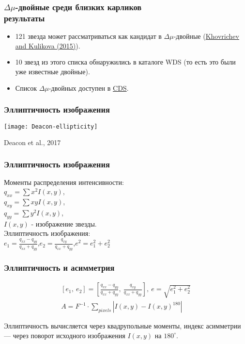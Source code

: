 \begin{frame}
\frametitle{$\Delta\mu$-двойные среди близких карликов\\{\small результаты}}
\begin{itemize}
\item 121 звезда может рассматриваться как кандидат в $\Delta\mu$-двойные (\href{https://ui.adsabs.harvard.edu/abs/2015AstL...41..833K/abstract}{Khovrichev and Kulikova (2015)}).
\item 10 звезд из этого списка обнаружились в каталоге WDS (то есть это были уже известные двойные).
\item Список $\Delta\mu$-двойных доступен в \href{http://vizier.u-strasbg.fr/viz-bin/VizieR-3?-source=J/PAZh/41/896/lpmsm15b}{CDS}.
\end{itemize}
\end{frame}






\begin{frame}
\frametitle{Эллиптичность изображения}
\begin{center}
	\texttt{[image: Deacon-ellipticity]}
\end{center}
{\footnotesize
	Deacon et al., 2017
}
\end{frame}


\begin{frame}
\frametitle{Эллиптичность изображения}
	Моменты распределения интенсивности:\\[5pt]
	$q_{xx}=\sum x^2 I(x,y)$,\\ $q_{xy}=\sum xy I(x,y)$,\\ $q_{yy}=\sum y^2 I(x,y)$,\\[10pt]
	$I(x,y)$ - изображение звезды.\\[15pt]
	Эллиптичность изображения:\\[5pt]
	$e_1 = \frac{q_{xx}-q_{yy}}{q_{xx}+q_{yy}}$,\qquad $e_2 = \frac{q_{xy}}{q_{xx}+q_{yy}}$,\qquad $e^2=e^2_1+e^2_2$
\end{frame}


\begin{frame}
\frametitle{Эллиптичность и асимметрия}
\begin{center}
{\small
\begin{align*}
\left[e_1,~e_2\right] = \left[\frac{q_{xx}-q_{yy}}{q_{xx}+q_{yy}},~\frac{q_{xy}}{q_{xx}+q_{yy}}\right],\: e = \sqrt{e_1^2+e_2^2}\\[15pt]
A = F^{-1}\cdot \sum_{pixels} |I(x,y)-I(x,y)^{180}|
\end{align*}
}
\end{center}
{\footnotesize
	Эллиптичность вычисляется через квадрупольные моменты, индекс асимметрии --- через поворот исходного изображения $I(x,y)$ на $180^\circ$.
}
\end{frame}



